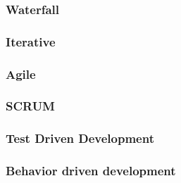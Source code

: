 \begin{frame}
\frametitle{Waterfall}
\end{frame}

\begin{frame}
\frametitle{Iterative}

\end{frame}

\begin{frame}
\frametitle{Agile}

\end{frame}

\begin{frame}
\frametitle{SCRUM}
\begin{figure}
\end{figure}

\end{frame}

\begin{frame}
\frametitle{Test Driven Development}

\end{frame}

\begin{frame}
\frametitle{Behavior driven development}
\end{frame}


